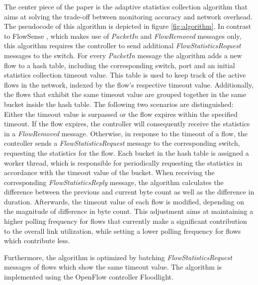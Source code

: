 \documentclass[DIV=12]{scrartcl}
\begin{document}
The center piece of the paper is the adaptive statistics collection algorithm that aims at solving the trade-off between monitoring accuracy and network overhead. The pseudocode of this algorithm is depicted in figure \ref{fig:algorithm}. In contrast to FlowSense \cite{g3.yu2013flowsense}, which makes use of \textit{PacketIn} and \textit{FlowRemoved} messages only, this algorithm requires the controller to send additional \textit{FlowStatisticsRequest} messages to the switch. For every \textit{PacketIn} message the algorithm adds a new flow to a hash table, including the corresponding switch, port and an initial statistics collection timeout value. This table is used to keep track of the active flows in the network, indexed by the flow's respective timeout value. Additionally, the flows that exhibit the same timeout value are grouped together in the same bucket inside the hash table. The following two scenarios are distinguished: Either the timeout value is surpassed or the flow expires within the specified timeout. If the flow expires, the controller will consequently receive the statistics in a \textit{FlowRemoved} message. 
Otherwise, in response to the timeout of a flow, the controller sends a \textit{FlowStatisticsRequest} message to the corresponding switch, requesting the statistics for the flow. Each bucket in the hash table is assigned a worker thread, which is responsible for periodically requesting the statistics in accordance with the timeout value of the bucket. When receiving the corresponding \textit{FlowStatisticsReply} message, the algorithm calculates the difference between the previous and current byte count as well as the difference in duration. Afterwards, the timeout value of each flow is modified, depending on the magnitude of difference in byte count. This adjustment aims at maintaining a higher polling frequency for flows that currently make a significant contribution to the overall link utilization, while setting a lower polling frequency for flows which contribute less.

Furthermore, the algorithm is optimized by batching \textit{FlowStatisticsRequest} messages of flows which show the same timeout value. The algorithm is implemented using the OpenFlow controller Floodlight.
\end{document}
